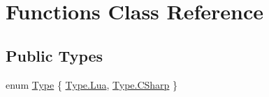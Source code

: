 \hypertarget{class_functions}{}\section{Functions Class Reference}
\label{class_functions}
\subsection*{Public Types}
\begin{DoxyCompactItemize}
\item 
enum \hyperlink{class_functions_a652bc8a0dcb6afd360459f15e2d9bdf4}{Type} \{ \hyperlink{class_functions_a652bc8a0dcb6afd360459f15e2d9bdf4a0ae9478a1db9d1e2c48efa49eac1c7c6}{Type.\+Lua}, 
\hyperlink{class_functions_a652bc8a0dcb6afd360459f15e2d9bdf4a83925001a044cdfe0c64e9a44345b66d}{Type.\+C\+Sharp}
 \}
\end{DoxyCompactItemize}
